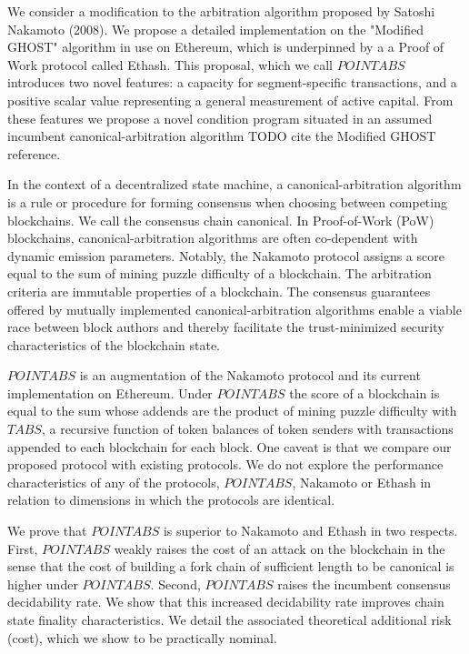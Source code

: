 \documentclass[11pt]{article}
\theoremstyle{plain}
\begin{document}
We consider a modification to the arbitration algorithm proposed by Satoshi Nakamoto (2008). We propose a detailed implementation on the "Modified GHOST" algorithm in use on Ethereum, which is underpinned by a a Proof of Work protocol called Ethash. This proposal, which we call $POINTABS$ introduces two novel features: a capacity for segment-specific transactions, and a positive scalar value representing a general measurement of active capital. From these features we propose a novel condition program situated in an assumed incumbent canonical-arbitration algorithm {\color{red}TODO cite the Modified GHOST reference}.

In the context of a decentralized state machine, a canonical-arbitration algorithm is a rule or procedure for forming consensus when choosing between competing blockchains. We call the consensus chain canonical. In Proof-of-Work (PoW) blockchains, canonical-arbitration algorithms are often co-dependent with dynamic emission parameters. Notably, the Nakamoto protocol assigns a score equal to the sum of mining puzzle difficulty of a blockchain. The arbitration criteria are immutable properties of a blockchain. The consensus guarantees offered by mutually implemented canonical-arbitration algorithms enable a viable race between block authors and thereby facilitate the trust-minimized security characteristics of the blockchain state.

$POINTABS$ is an augmentation of the Nakamoto protocol and its current implementation on Ethereum. Under $POINTABS$ the score of a blockchain is equal to the sum whose addends are the product of mining puzzle difficulty with $TABS$, a recursive function of token balances of token senders with transactions appended to each blockchain for each block. One caveat is that we compare our proposed protocol with existing protocols. We do not explore the performance characteristics of any of the protocols, $POINTABS$, Nakamoto or Ethash in relation to dimensions in which the protocols are identical. 

We prove that $POINTABS$ is superior to Nakamoto and Ethash in two respects. First, $POINTABS$ weakly raises the cost of an attack on the blockchain in the sense that the cost of building a fork chain of sufficient length to be canonical is higher under $POINTABS$. Second, $POINTABS$ raises the incumbent consensus decidability rate. We show that this increased decidability rate improves chain state finality characteristics. We detail the associated theoretical additional risk (cost), which we show to be practically nominal. 
\end{document}
